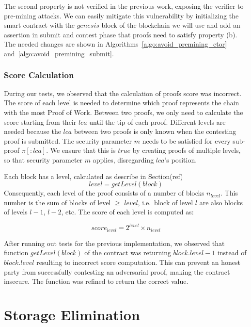 The second property is not verified in the previous work, exposing the verifier
to pre-mining attacks. We can easily mitigate this vulnerability by
initializing the smart contract with the $genesis$ block of the blockchain we
will use and add an assertion in submit and contest phase that proofs need to
satisfy property (b). The needed changes are shown in
Algorithms~\ref{algo:avoid_premining_ctor}
and~\ref{algo:avoid_premining_submit}.



\subsubsection{Score Calculation}

During our tests, we observed that the calculation of proofs score was
incorrect. The score of each level is needed to determine which proof
represents the chain with the most Proof of Work. Between two proofs, we only
need to calculate the score starting from their $lca$ until the tip of each
proof. Different levels are needed because the $lca$ between two proofs is only
known when the contesting proof is submitted. The security parameter $m$ needs
to be satisfied for every sub-proof $\pi[:lca]$. We ensure that this is $true$
by creating proofs of multiple levels, so that security parameter $m$ applies,
disregarding $lca$'s position.


Each block has a level, calculated as describe in Section(ref)
\[ level = getLevel(block) \]
Consequently, each level of the proof consists of a number of blocks
$n_{level}$. This number is the sum of blocks of level $\geq$ $level$, i.e.\
block of level $l$ are also blocks of levels $l-1$, $l-2$, etc. The
score of each level is computed as:

\[score_{level} = 2^{level} \times n_{level}\]

After running out tests for the previous implementation, we observed that
function $getLevel(block)$ of the contract was returning $block.level-1$
instead of $block.level$ resulting to incorrect score computation. This can
prevent an honest party from successfully contesting an adversarial proof,
making the contract insecure. The function was refined to return the correct
value.

\section{Storage Elimination}

